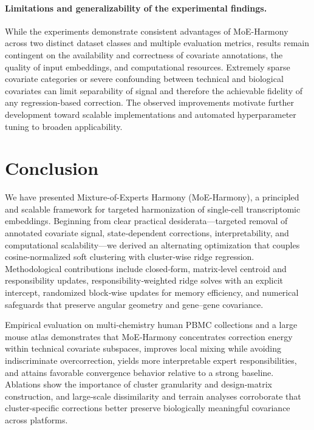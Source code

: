 \documentclass{article}
\begin{document}
\paragraph{Limitations and generalizability of the experimental findings.} While the experiments demonstrate consistent advantages of MoE\hyp{}Harmony across two distinct dataset classes and multiple evaluation metrics, results remain contingent on the availability and correctness of covariate annotations, the quality of input embeddings, and computational resources. Extremely sparse covariate categories or severe confounding between technical and biological covariates can limit separability of signal and therefore the achievable fidelity of any regression\hyp{}based correction. The observed improvements motivate further development toward scalable implementations and automated hyperparameter tuning to broaden applicability.

\section{Conclusion}

We have presented Mixture-of-Experts Harmony (MoE-Harmony), a principled and scalable framework for targeted harmonization of single‑cell transcriptomic embeddings. Beginning from clear practical desiderata—targeted removal of annotated covariate signal, state‑dependent corrections, interpretability, and computational scalability—we derived an alternating optimization that couples cosine‑normalized soft clustering with cluster‑wise ridge regression. Methodological contributions include closed‑form, matrix‑level centroid and responsibility updates, responsibility‑weighted ridge solves with an explicit intercept, randomized block‑wise updates for memory efficiency, and numerical safeguards that preserve angular geometry and gene–gene covariance.

Empirical evaluation on multi‑chemistry human PBMC collections and a large mouse atlas demonstrates that MoE‑Harmony concentrates correction energy within technical covariate subspaces, improves local mixing while avoiding indiscriminate overcorrection, yields more interpretable expert responsibilities, and attains favorable convergence behavior relative to a strong baseline. Ablations show the importance of cluster granularity and design‑matrix construction, and large‑scale dissimilarity and terrain analyses corroborate that cluster‑specific corrections better preserve biologically meaningful covariance across platforms.
\end{document}
